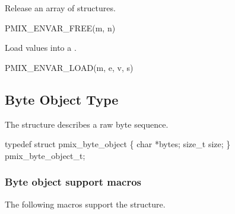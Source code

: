 
Release an array of  structures.

\cspecificstart
\begin{codepar}
PMIX_ENVAR_FREE(m, n)
\end{codepar}
\cspecificend

\begin{arglist}
\end{arglist}


Load values into a .

\cspecificstart
\begin{codepar}
PMIX_ENVAR_LOAD(m, e, v, s)
\end{codepar}
\cspecificend

\begin{arglist}
\end{arglist}


\subsection{Byte Object Type}

The  structure describes a raw byte sequence.

\cspecificstart
\begin{codepar}
typedef struct pmix_byte_object \{
    char *bytes;
    size_t size;
\} pmix_byte_object_t;
\end{codepar}
\cspecificend

\subsubsection{Byte object support macros}
The following macros support the  structure.

